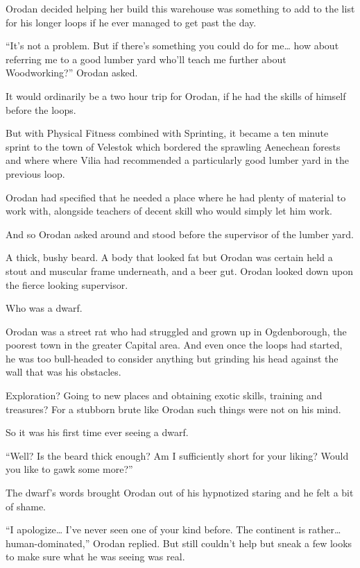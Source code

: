 \documentclass[a4paper,10pt]{book}
\begin{document}
Orodan decided helping her build this warehouse was something to add to the list for his longer loops if he ever managed to get past the day.\par
“It’s not a problem. But if there’s something you could do for me… how about referring me to a good lumber yard who’ll teach me further about Woodworking?” Orodan asked.\par
\par
It would ordinarily be a two hour trip for Orodan, if he had the skills of himself before the loops.\par
But with Physical Fitness combined with Sprinting, it became a ten minute sprint to the town of Velestok which bordered the sprawling Aenechean forests and where where Vilia had recommended a particularly good lumber yard in the previous loop.\par
Orodan had specified that he needed a place where he had plenty of material to work with, alongside teachers of decent skill who would simply let him work.\par
And so Orodan asked around and stood before the supervisor of the lumber yard.\par
A thick, bushy beard. A body that looked fat but Orodan was certain held a stout and muscular frame underneath, and a beer gut. Orodan looked down upon the fierce looking supervisor.\par
Who was a dwarf.\par
Orodan was a street rat who had struggled and grown up in Ogdenborough, the poorest town in the greater Capital area. And even once the loops had started, he was too bull-headed to consider anything but grinding his head against the wall that was his obstacles.\par
Exploration? Going to new places and obtaining exotic skills, training and treasures? For a stubborn brute like Orodan such things were not on his mind.\par
So it was his first time ever seeing a dwarf.\par
“Well? Is the beard thick enough? Am I sufficiently short for your liking? Would you like to gawk some more?”\par
The dwarf’s words brought Orodan out of his hypnotized staring and he felt a bit of shame.\par
“I apologize… I’ve never seen one of your kind before. The continent is rather… human-dominated,” Orodan replied. But still couldn’t help but sneak a few looks to make sure what he was seeing was real.\par
\end{document}
